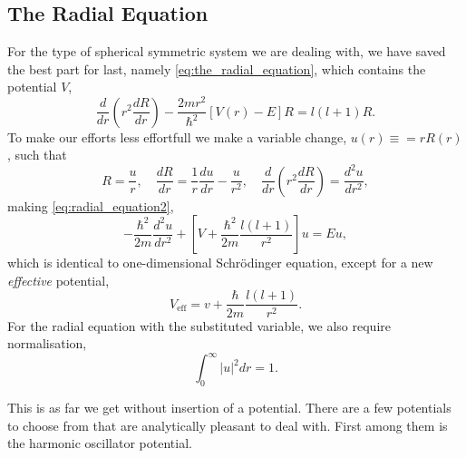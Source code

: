 \subsection{The Radial Equation}

For the type of spherical symmetric system we are dealing with, we have 
saved the best part for last, namely \autoref{eq:the_radial_equation},
which contains the potential $V$,
\begin{equation}
    \label{eq:radial_equation2}
    \frac{d}{dr}\left(r^2\frac{dR}{dr} \right)
    -
    \frac{2mr^2}{\hbar^2} [V(r) - E]R
    =
    l(l + 1)R.
\end{equation}
To make our efforts less effortfull we make a variable change, $u(r) \equiv = r R(r)$,
such that 
\begin{equation*}
    R = \frac{u}{r}, \quad
    \frac{dR}{dr} = \frac{1}{r}\frac{du}{dr} - \frac{u}{r^2}, \quad 
    \frac{d}{dr}\left(r^2 \frac{dR}{dr} \right)
        = \frac{d^2u}{dr^2},
\end{equation*}
making \autoref{eq:radial_equation2},
\begin{equation}
    - \frac{\hbar^2}{2m}\frac{d^2u}{dr^2}
    +
    \left[
        V + \frac{\hbar^2}{2m}\frac{l(l + 1)}{r^2} 
    \right]
    u = Eu,
\end{equation}
which is identical to one-dimensional Schrödinger equation, except for 
a new \emph{effective} potential,
\begin{equation}
    V_\text{eff} = v + \frac{\hbar}{2m}\frac{l(l + 1)}{r^2}.
\end{equation}
For the radial equation with the substituted variable, we also require normalisation,
\begin{equation} 
    \int_0^\infty |u|^2 dr = 1.
\end{equation}

This is as far we get without insertion of a potential. There are a few potentials 
to choose from that are analytically pleasant to deal with. First among them is the 
harmonic oscillator potential.